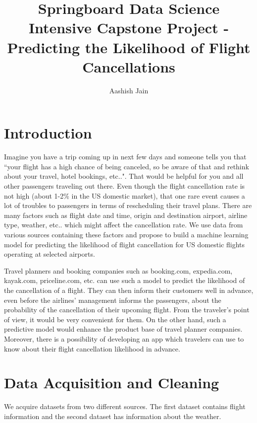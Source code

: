 \documentclass[12pt]{article}
\author{Aashish Jain}
\title{Springboard Data Science Intensive Capstone Project - Predicting the Likelihood of Flight Cancellations}
\begin{document}
\setcounter{page}{-1}
\maketitle
\thispagestyle{empty}
\thispagestyle{empty}
\newpage
\tableofcontents
\thispagestyle{empty}
\newpage
\large
\section{Introduction}
\label{Sec:intro}
Imagine you have a trip coming up in next few days and someone tells you that ``your flight has a high chance of being canceled, so be aware of that and rethink about your travel, hotel bookings, etc..". That would be helpful for you and all other passengers traveling out there. Even though the flight cancellation rate is not high (about 1-2$\%$ in the US domestic market), that one rare event causes a lot of troubles to passengers in terms of rescheduling their travel plans. There are many factors such as flight date and time, origin and destination airport, airline type, weather, etc.. which might affect the cancellation rate. We use data from various sources containing these factors and propose to build a machine learning model for predicting the likelihood of flight cancellation for US domestic flights operating at selected airports.


Travel planners and booking companies such as booking.com, expedia.com, kayak.com, priceline.com, etc. can use such a model to predict the likelihood of the cancellation of a flight. They can then inform their customers well in advance, even before the airlines' management informs the passengers, about the probability of the cancellation of their upcoming flight. From the traveler's point of view, it would be very convenient for them. On the other hand, such a predictive model would enhance the product base of travel planner companies. Moreover, there is a possibility of developing an app which travelers can use to know about their flight cancellation likelihood in advance.
\section{Data Acquisition and Cleaning}
\label{sec:dataclean}
We acquire datasets from two different sources. The first dataset contains flight information and the second dataset has information about the weather. 
\end{document}

